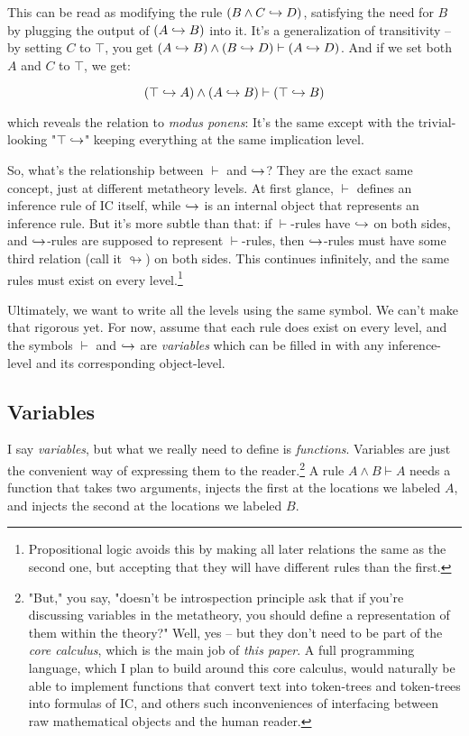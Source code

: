 \documentclass{article}
\begin{document}
  This can be read as modifying the rule $(B \wedge C \hookrightarrow D)$, satisfying the need for $B$ by plugging the output of $(A \hookrightarrow B)$ into it. It's a generalization of transitivity – by setting $C$ to $\top$, you get $(A \hookrightarrow B) \wedge (B \hookrightarrow D) \vdash (A \hookrightarrow D)$. And if we set both $A$ and $C$ to $\top$, we get:
  
  \begin{equation*}
    (\top \hookrightarrow A) \wedge (A \hookrightarrow B) \vdash (\top \hookrightarrow B)\\
  \end{equation*}
  
  which reveals the relation to \emph{modus ponens}: It's the same except with the trivial-looking "$\top \hookrightarrow$" keeping everything at the same implication level.
  
  So, what's the relationship between $\vdash$ and $\hookrightarrow$? They are the exact same concept, just at different metatheory levels. At first glance, $\vdash$ defines an inference rule of IC itself, while $\hookrightarrow$ is an internal object that represents an inference rule. But it's more subtle than that: if $\vdash$-rules have $\hookrightarrow$ on both sides, and $\hookrightarrow$-rules are supposed to represent $\vdash$-rules, then $\hookrightarrow$-rules must have some third relation (call it $\looparrowright$) on both sides. This continues infinitely, and the same rules must exist on every level.\footnote{Propositional logic avoids this by making all later relations the same as the second one, but accepting that they will have different rules than the first.}
  
  Ultimately, we want to write all the levels using the same symbol. We can't make that rigorous yet. For now, assume that each rule does exist on every level, and the symbols $\vdash$ and $\hookrightarrow$ are \emph{variables} which can be filled in with any inference-level and its corresponding object-level.
  
  \subsection{Variables}
  
  I say \emph{variables}, but what we really need to define is \emph{functions}. Variables are just the convenient way of expressing them to the reader.\footnote{"But," you say, "doesn't be introspection principle ask that if you're discussing variables in the metatheory, you should define a representation of them within the theory?" Well, yes – but they don't need to be part of the \emph{core calculus}, which is the main job of \emph{this paper}. A full programming language, which I plan to build around this core calculus, would naturally be able to implement functions that convert text into token-trees and token-trees into formulas of IC, and others such inconveniences of interfacing between raw mathematical objects and the human reader.} A rule $A \wedge B \vdash A$ needs a function that takes two arguments, injects the first at the locations we labeled $A$, and injects the second at the locations we labeled $B$.
  
\end{document}
